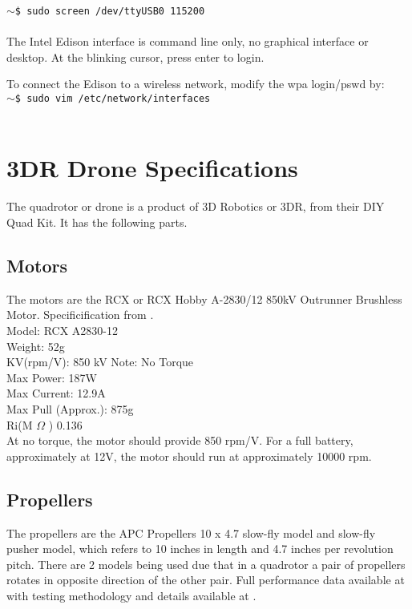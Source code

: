 \documentclass[letterpaper, 12pt]{article}
\newcommand{\shellcmd}[2]{\texttt{\large{#1}\$ {#2}\\}}
\begin{document}
\shellcmd{\bf$\sim$}{sudo screen /dev/ttyUSB0 115200}\\

The Intel Edison interface is command line only, no graphical interface or desktop. At the blinking cursor, press enter to login.

To connect the Edison to a wireless network, modify the wpa login/pswd by:\\

\shellcmd{\bf$\sim$}{sudo vim /etc/network/interfaces}\\

\section{3DR Drone Specifications}
The quadrotor or drone is a product of 3D Robotics or 3DR, from their DIY Quad Kit. It has the following parts.

\subsection{Motors}
The motors are the RCX or RCX Hobby A-2830/12 850kV Outrunner Brushless Motor. Specificification from \cite{motor_specs}.\\

\noindent Model:  RCX A2830-12\\
Weight: 52g\\
KV(rpm/V): 850 kV \small{Note: No Torque}\\
Max Power: 187W\\
Max Current: 12.9A\\
Max Pull (Approx.): 875g\\
Ri(M $\Omega$ ) 0.136\\

At no torque, the motor should provide 850 rpm/V. For a full battery, approximately at 12V, the motor should run at approximately 10000 rpm.

\subsection{Propellers}
The propellers are the APC Propellers 10 x 4.7 slow-fly model and slow-fly pusher model, which refers to 10 inches in length and 4.7 inches per revolution pitch. There are 2 models being used due that in a quadrotor a pair of propellers rotates in opposite direction of the other pair. Full performance data available at \cite{propeller_data} with testing methodology and details available at \cite{propeller_thesis}.
\end{document}
